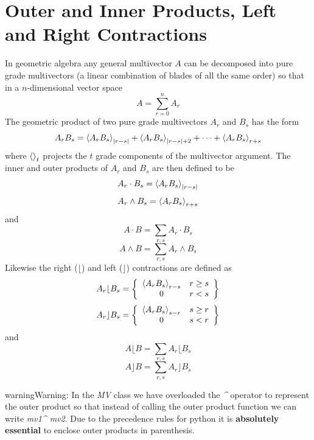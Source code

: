 \documentclass[letterpaper,10pt,english]{sphinxmanual}
\begin{document}
\chapter{Outer and Inner Products, Left and Right Contractions}
\label{GA:outer-and-inner-products-left-and-right-contractions}
In geometric algebra any general multivector $A$ can be decomposed into
pure grade multivectors (a linear combination of blades of all the same order)
so that in a $n$-dimensional vector space
\begin{equation*}
A = \sum_{r = 0}^{n}A_{r}
\end{equation*}
The geometric product of two pure grade multivectors $A_{r}$ and
$B_{s}$ has the form
\begin{equation*}
A_{r}B_{s} = \left < {A_{r}B_{s}} \right >_{\left |{r-s}\right |}+\left < {A_{r}B_{s}} \right >_{\left |{r-s}\right |+2}+\cdots+\left < {A_{r}B_{s}} \right >_{r+s}
\end{equation*}
where $\left < {} \right >_{t}$ projects the $t$ grade components of the
multivector argument.  The inner and outer products of $A_{r}$ and
$B_{s}$ are then defined to be
\begin{equation*}
A_{r}\cdot B_{s} = \left < {A_{r}B_{s}} \right >_{\left |{r-s}\right |}
\end{equation*}\begin{equation*}
A_{r}\wedge B_{s} = \left < {A_{r}B_{s}} \right >_{r+s}
\end{equation*}
and
\begin{equation*}
A\cdot B = \sum_{r,s}A_{r}\cdot B_{s}
\end{equation*}\begin{equation*}
A\wedge B = \sum_{r,s}A_{r}\wedge B_{s}
\end{equation*}
Likewise the right ($\lfloor$) and left ($\rfloor$) contractions are defined as
\begin{equation*}
A_{r}\lfloor B_{s} = \left \{ \begin{array}{cc}
   \left < {A_{r}B_{s}} \right >_{r-s} &  r \ge s \\
             0            &  r < s \end{array} \right \}
\end{equation*}\begin{equation*}
A_{r}\rfloor B_{s} = \left \{ \begin{array}{cc}
   \left < {A_{r}B_{s}} \right >_{s-r} &  s \ge r \\
             0            &  s < r \end{array} \right \}
\end{equation*}
and
\begin{equation*}
A\lfloor B = \sum_{r,s}A_{r}\lfloor B_{s}
\end{equation*}\begin{equation*}
A\rfloor B = \sum_{r,s}A_{r}\rfloor B_{s}
\end{equation*}
\begin{notice}{warning}{Warning:}
In the  \emph{MV} class we have overloaded the \emph{\textasciicircum{}} operator to represent the outer
product so that instead of calling the outer product function we can write \emph{mv1\textasciicircum{} mv2}.
Due to the precedence rules for python it is \textbf{absolutely essential} to enclose outer products
in parenthesis.
\end{notice}
\end{document}
